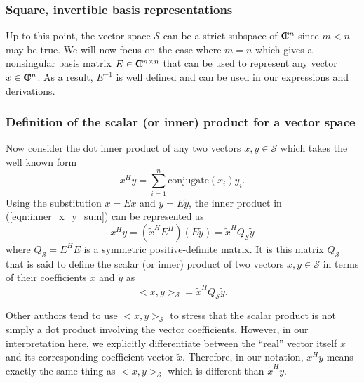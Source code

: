 \subsubsection{Square, invertible basis representations}

Up to this point, the vector space $\mathcal{S}$ can be a strict subspace of
$\mbox{\textbf{C}}\hspace{-1.1ex}\mbox{l}\hspace{0.4ex}^n$ since $m < n$ may be true.  We will now focus on the case where $m =
n$ which gives a nonsingular basis matrix $E\in\mbox{\textbf{C}}\hspace{-1.1ex}\mbox{l}\hspace{0.4ex}^{n\times{}n}$ that can be
used to represent any vector $x\in\mbox{\textbf{C}}\hspace{-1.1ex}\mbox{l}\hspace{0.4ex}^n$.  As a result, $E^{-1}$ is well
defined and can be used in our expressions and derivations.

\subsubsection{Definition of the scalar (or inner) product for a vector space}

Now consider the dot inner product of any two vectors $x,y\in\mathcal{S}$
which takes the well known form
%
\begin{equation}
x^H y = \sum_{i=1}^n \mbox{conjugate}(x_i) y_i.
\label{eqn:inner_x_y_sum}
\end{equation}
%
Using the substitution $x = E {}\tilde{x}$ and $y = E {}\tilde{y}$, the inner
product in (\ref{eqn:inner_x_y_sum}) can be represented as
%
\begin{equation}
x^H y = ( \tilde{x}^H E^H ) ( E \tilde{y} ) = \tilde{x}^H Q_{\mathcal{S}} \tilde{y}
\label{eqn:inner_x_y_E_prod}
\end{equation}
%
where $Q_{\mathcal{S}} = E^H E$ is a symmetric positive-definite matrix.  It
is this matrix $Q_{\mathcal{S}}$ that is said to define the scalar (or inner)
product of two vectors $x,y\in\mathcal{S}$ in terms of their coefficients
$\tilde{x}$ and $\tilde{y}$ as
%
\begin{equation}
<x,y>_{\mathcal{S}} = \tilde{x}^H Q_{\mathcal{S}} \tilde{y}.
\label{eqn:inner_prod_defined}
\end{equation}
%

Other authors tend to use $<x,y>_{\mathcal{S}}$ to stress that the scalar
product is not simply a dot product involving the vector coefficients.
However, in our interpretation here, we explicitly differentiate between the
``real'' vector itself $x$ and its corresponding coefficient vector
$\tilde{x}$.  Therefore, in our notation, $x^H y$ means exactly the same thing
as $<x,y>_{\mathcal{S}}$ which is different than $\tilde{x}^H {}\tilde{y}$.

